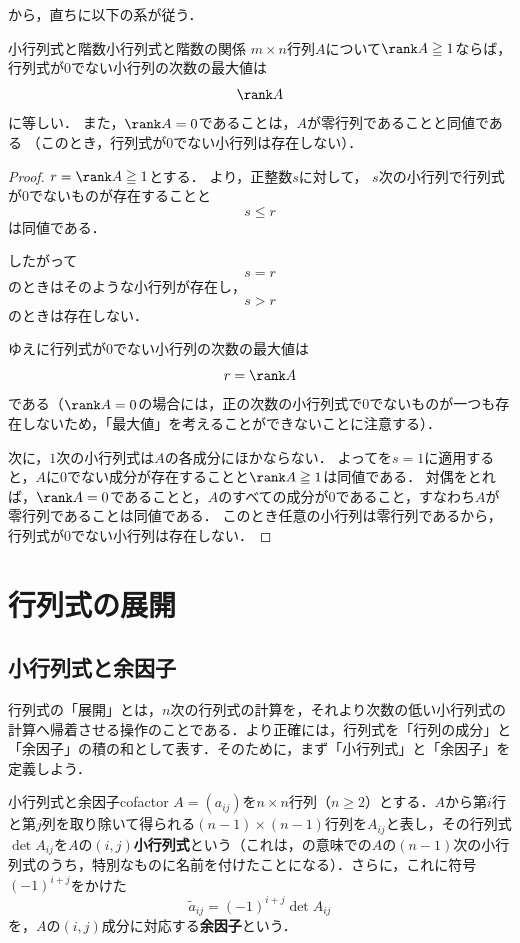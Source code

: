 から，直ちに以下の系が従う．

\begin{cor}{小行列式と階数}{小行列式と階数の関係}
  $m\times n$行列$A$について$\rank A \geqq 1$ならば，
  行列式が$0$でない小行列の次数の最大値は
  \[
    \rank A
  \]
  に等しい．
  また，$\rank A = 0$であることは，$A$が零行列であることと同値である
  （このとき，行列式が$0$でない小行列は存在しない）．
\end{cor}

\begin{leftbar}
\begin{proof}
$r = \rank A \geqq 1$とする．
より，正整数$s$に対して，
$s$次の小行列で行列式が$0$でないものが存在することと
\[
s\le r
\]
は同値である．

したがって
\[
s=r
\]
のときはそのような小行列が存在し，
\[
s>r
\]
のときは存在しない．

ゆえに行列式が$0$でない小行列の次数の最大値は
\[
r=\rank A
\]
である（$\rank A = 0$の場合には，正の次数の小行列式で$0$でないものが一つも存在しないため，「最大値」を考えることができないことに注意する）．

次に，$1$次の小行列式は$A$の各成分にほかならない．
よってを$s = 1$に適用すると，$A$に$0$でない成分が存在することと$\rank A \geqq 1$は同値である．
対偶をとれば，$\rank A = 0$であることと，$A$のすべての成分が$0$であること，すなわち$A$が零行列であることは同値である．
このとき任意の小行列は零行列であるから，行列式が$0$でない小行列は存在しない．
\end{proof}
\end{leftbar}

\section{行列式の展開}

\subsection{小行列式と余因子}

行列式の「展開」とは，$n$次の行列式の計算を，それより次数の低い小行列式の計算へ帰着させる操作のことである．より正確には，行列式を「行列の成分」と「余因子」の積の和として表す．そのために，まず「小行列式」と「余因子」を定義しよう．

\begin{definition}{小行列式と余因子}{cofactor}
  $A = (a_{ij})$を$n \times n$行列（$n \geq 2$）とする．$A$から第$i$行と第$j$列を取り除いて得られる$(n-1) \times (n-1)$行列を$A_{ij}$と表し，その行列式$\det A_{ij}$を$A$の$(i,j)$\textbf{小行列式}という（これは，の意味での$A$の$(n-1)$次の小行列式のうち，特別なものに名前を付けたことになる）．さらに，これに符号$(-1)^{i+j}$をかけた
  \[
  \tilde{a}_{ij} = (-1)^{i+j} \det A_{ij}
  \]
  を，$A$の$(i,j)$成分に対応する\textbf{余因子}という．
\end{definition}

